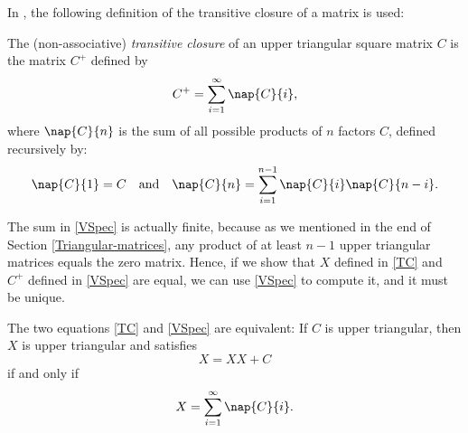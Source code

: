 In \cite{Valiant}, the following definition of the transitive closure of a matrix is used:
\begin{Definition}
  The (non-associative) \emph{transitive closure} of an upper triangular square matrix $C$ is the matrix $C^+$ defined by
  \begin{equation}\label{VSpec}
    C^+ = \sum_{i = 1}^\infty \nap{C}{i},
  \end{equation}
  where $\nap{C}{n}$ is the sum of all possible products of $n$ factors $C$, defined recursively by:
  \begin{equation*}
    \nap{C}{1} = C \quad \text{and} \quad \nap{C}{n} = \sum_{i = 1}^{n - 1}\nap{C}{i}\nap{C}{n - i}.
  \end{equation*}
\end{Definition}
The sum in \eqref{VSpec} is actually finite, because as we mentioned in the end of Section \ref{Triangular-matrices}, any product of at least $n -1$ upper triangular matrices equals the zero matrix. Hence, if we show that $X$ defined in \eqref{TC} and $C^+$ defined in \eqref{VSpec} are equal, we can use \eqref{VSpec} to compute it, and it must be unique.
 \begin{Proposition}
   The two equations \eqref{TC} and \eqref{VSpec} are equivalent: If $C$ is upper triangular, then $X$ is upper triangular and satisfies
   \begin{equation}
     X = XX + C
   \end{equation}
   if and only if
   \begin{equation}
     X = \sum_{i = 1}^\infty \nap{C}{i}.
   \end{equation}
 \end{Proposition}
